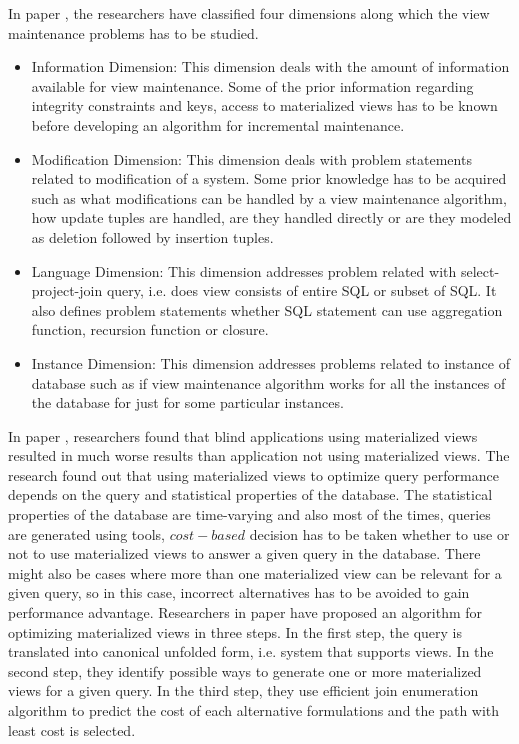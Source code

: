 \documentclass[11pt,a4paper,bibtotoc,idxtotoc,headsepline,footsepline,footexclude,BCOR12mm,DIV13]{scrbook}
\begin{document}
In paper \cite{maintenance:materializedviews}, the researchers have classified four dimensions along which the view maintenance problems has to be studied. 
\begin{itemize}
	\item Information Dimension: This dimension deals with the amount of information available for view maintenance. Some of the prior information regarding integrity constraints and keys, access to materialized views has to be known before developing an algorithm for incremental maintenance.
	
	\item Modification Dimension: This dimension deals with problem statements related to modification of a system. Some prior knowledge has to be acquired such as what modifications can be handled by a view maintenance algorithm, how update tuples are handled, are they handled directly or are they modeled as deletion followed by insertion tuples.
	
	\item Language Dimension: This dimension addresses problem related with select-project-join query, i.e. does view consists of entire SQL or subset of SQL. It also defines problem statements whether SQL statement can use aggregation function, recursion function or closure. 
	
	\item Instance Dimension: This dimension addresses problems related to instance of database such as if view maintenance algorithm works for all the instances of the database for just for some particular instances. 

\end{itemize}

In paper \cite{maintenance:optimizingqueries}, researchers found that blind applications using materialized views resulted in much worse results than application not using materialized views. The research found out that using materialized views to optimize query performance depends on the query and statistical properties of the database\cite{maintenance:optimizingqueries}. The statistical properties of the database are time-varying and also most of the times, queries are generated using tools, $cost-based$ decision has to be taken whether to use or not to use materialized views to answer a given query in the database\cite{maintenance:optimizingqueries}. There might also be cases where more than one materialized view can be relevant for a given query, so in this case, incorrect alternatives has to be avoided to gain performance advantage. Researchers in paper \cite{maintenance:optimizingqueries} have proposed an algorithm for optimizing materialized views in three steps. In the first step, the query is translated into canonical unfolded form, i.e. system that supports views. In the second step, they identify possible ways to generate one or more materialized views for a given query. In the third step, they use efficient join enumeration algorithm to predict the cost of each alternative formulations and the path with least cost is selected\cite{maintenance:optimizingqueries}.
\end{document}
